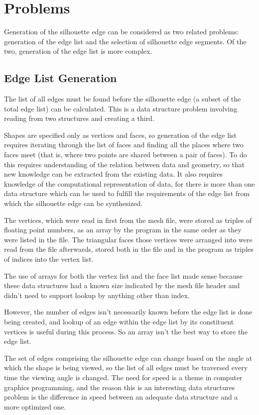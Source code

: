 \documentclass[10pt,twocolumn]{article}
\begin{document}
\section{Problems}
Generation of the silhouette edge can be considered as two related problems: generation of the edge list and the selection of silhouette edge segments.  Of the two, generation of the edge list is more complex.  

\subsection{Edge List Generation}
The list of all edges must be found before the silhouette edge (a subset of the total edge list) can be calculated.  This is a data structure problem involving reading from two structures and creating a third.  

Shapes are specified only as vertices and faces, so generation of the edge list requires iterating through the list of faces and finding all the places where two faces meet (that is, where two points are shared between a pair of faces).  To do this requires understanding of the relation between data and geometry, so that new knowledge can be extracted from the existing data.  It also requires knowledge of the computational representation of data, for there is more than one data structure which can be used to fulfill the requirements of the edge list from which the silhouette edge can be synthesized.  

The vertices, which were read in first from the mesh file, were stored as triples of floating point numbers, as an array by the program in the same order as they were listed in the file.  The triangular faces those vertices were arranged into were read from the file afterwards, stored both in the file and in the program as triples of indices into the vertex list.  

The use of arrays for both the vertex list and the face list made sense because these data structures had a known size indicated by the mesh file header and didn't need to support lookup by anything other than index.  

However, the number of edges isn't necessarily known before the edge list is done being created, and lookup of an edge within the edge list by its constituent vertices is useful during this process.  So an array isn't the best way to store the edge list.  

The set of edges comprising the silhouette edge can change based on the angle at which the shape is being viewed, so the list of all edges must be traversed every time the viewing angle is changed.  The need for speed is a theme in computer graphics programming, and the reason this is an interesting data structures problem is the difference in speed between an adequate data structure and a more optimized one.  
\end{document}
